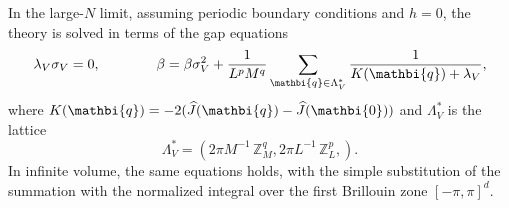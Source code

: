 \documentclass[a4paper,12pt]{article}
\newcommand{\pos}[1]{\mathbi{#1}}
\begin{document}
In the large-$N$ limit,
assuming periodic boundary conditions and $h=0$,
the theory is solved in terms of the gap equations 
\begin{eqnarray}
\lambda_V \sigma_V = 0, \qquad\qquad
\beta = \beta \sigma_V^2 +
    {1\over L^p M^q} \sum_{\pos{q}\in \Lambda^*_V}
   {1\over K(\pos{q}) + \lambda_V },
\label{infty}
\end{eqnarray}
where $K(\pos{q}) = - 2 (\widehat{J}(\pos{q}) - \widehat{J}(\pos{0}))$ 
and $\Lambda^*_V$ is the
lattice
\begin{equation}
\Lambda_V^* = \left( {2\pi M^{-1}}\, \mathbb{Z}^q_{M}, {2\pi L^{-1}}\, 
\mathbb{Z}^p_{L}, \right).
\label{duallatt}
\end{equation}
In infinite volume, the same equations holds, with the simple
substitution of the summation with the normalized integral over the 
first Brillouin zone $[-\pi,\pi]^d$.
\end{document}

